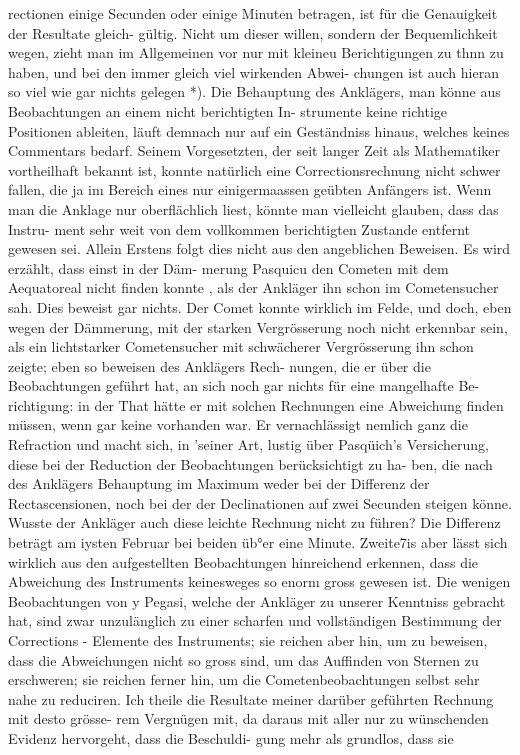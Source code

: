 \documentclass[12pt,a4paper]{article}
\begin{document}
{{{{{{{{rectionen  einige  Secunden  oder  einige  Minuten  betragen,  ist  für  die  Genauigkeit  der  Resultate  gleich- gültig. Nicht  um  dieser  willen,  sondern  der  Bequemlichkeit  wegen,  zieht  man  im  Allgemeinen  vor nur  mit  kleineu  Berichtigungen  zu  thnn  zu  haben,  und  bei  den  immer  gleich  viel  wirkenden  Abwei- chungen ist  auch  hieran  so  viel  wie  gar  nichts  gelegen  *). Die  Behauptung  des  Anklägers,  man  könne  aus  Beobachtungen  an  einem  nicht  berichtigten  In- strumente keine  richtige  Positionen  ableiten,  läuft  demnach  nur  auf  ein  Geständniss  hinaus,  welches keines  Commentars  bedarf.  Seinem  Vorgesetzten,  der  seit  langer  Zeit  als  Mathematiker  vortheilhaft bekannt  ist,  konnte  natürlich  eine  Correctionsrechnung  nicht  schwer  fallen,  die  ja  im  Bereich  eines  nur einigermaassen  geübten  Anfängers  ist. Wenn  man  die  Anklage  nur  oberflächlich  liest,  könnte  man  vielleicht  glauben,  dass  das  Instru- ment sehr  weit  von  dem  vollkommen  berichtigten  Zustande  entfernt  gewesen  sei.     Allein Erstens  folgt  dies  nicht  aus  den  angeblichen  Beweisen.  Es  wird  erzählt,  dass  einst  in  der  Däm- merung Pasquicu  den  Cometen  mit  dem  Aequatoreal  nicht  finden  konnte ,  als  der  Ankläger  ihn  schon im  Cometensucher  sah.  Dies  beweist  gar  nichts.  Der  Comet  konnte  wirklich  im  Felde,  und  doch,  eben wegen  der  Dämmerung,  mit  der  starken  Vergrösserung  noch  nicht  erkennbar  sein,  als  ein  lichtstarker Cometensucher  mit  schwächerer  Vergrösserung  ihn  schon  zeigte;  eben  so  beweisen  des  Anklägers  Rech- nungen, die  er  über  die  Beobachtungen  geführt  hat,  an  sich  noch  gar  nichts  für  eine  mangelhafte  Be- richtigung: in  der  That  hätte  er  mit  solchen  Rechnungen  eine  Abweichung  finden  müssen,  wenn  gar keine  vorhanden  war.  Er  vernachlässigt  nemlich  ganz  die  Refraction  und  macht  sich,  in 'seiner  Art, lustig  über  Pasqüich's  Versicherung,  diese  bei  der  Reduction  der  Beobachtungen  berücksichtigt  zu  ha- ben, die  nach  des  Anklägers  Behauptung  im  Maximum  weder  bei  der  Differenz  der  Rectascensionen, noch  bei  der  der  Declinationen  auf  zwei  Secunden  steigen  könne.  Wusste  der  Ankläger  auch  diese leichte  Rechnung  nicht  zu  führen?  Die  Differenz  beträgt  am  iysten  Februar  bei  beiden  üb°er  eine  Minute. Zweite7is  aber  lässt  sich  wirklich  aus  den  aufgestellten  Beobachtungen  hinreichend  erkennen,  dass die  Abweichung  des  Instruments  keinesweges  so  enorm  gross  gewesen  ist. Die  wenigen  Beobachtungen  von  y  Pegasi,  welche  der  Ankläger  zu  unserer  Kenntniss  gebracht hat,  sind  zwar  unzulänglich  zu  einer  scharfen  und  vollständigen  Bestimmung  der  Corrections  -  Elemente des  Instruments;  sie  reichen  aber  hin,  um  zu  beweisen,  dass  die  Abweichungen  nicht  so  gross  sind,  um das  Auffinden  von  Sternen  zu  erschweren;  sie  reichen  ferner  hin,  um  die  Cometenbeobachtungen  selbst sehr  nahe  zu  reduciren.  Ich  theile  die  Resultate  meiner  darüber  geführten  Rechnung  mit  desto  grösse- rem Vergnügen  mit,  da  daraus  mit  aller  nur  zu  wünschenden  Evidenz  hervorgeht,  dass  die  Beschuldi- gung  mehr  als  grundlos,  dass  sie  }}}}}}}}
\end{document}
